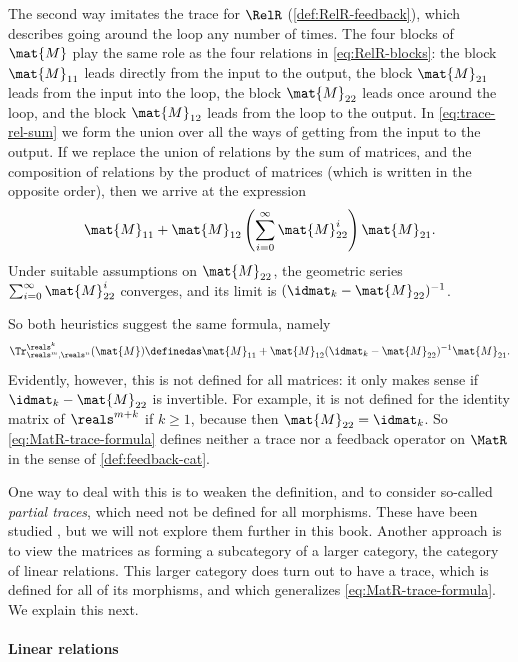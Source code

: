 The second way imitates the trace for $\RelR$ (\cref{def:RelR-feedback}), which describes going around the loop any number of times.
The four blocks of $\mat{M}$ play the same role as the four relations in \cref{eq:RelR-blocks}: the block $\mat{M}_{11}$ leads directly from the input to the output, the block $\mat{M}_{21}$ leads from the input into the loop, the block $\mat{M}_{22}$ leads once around the loop, and the block $\mat{M}_{12}$ leads from the loop to the output.
In \cref{eq:trace-rel-sum} we form the union over all the ways of getting from the input to the output.
If we replace the union of relations by the sum of matrices, and the composition of relations by the product of matrices (which is written in the opposite order), then we arrive at the expression
\begin{equation}
    \label{eq:MatR-trace-series}
    \mat{M}_{11} + \mat{M}_{12} \left( \sum_{i=0}^\infty \mat{M}_{22}^i \right) \mat{M}_{21}.
\end{equation}
Under suitable assumptions on $\mat{M}_{22}$, the geometric series $\sum_{i=0}^\infty \mat{M}_{22}^i$ converges, and its limit is $(\idmat_k - \mat{M}_{22})^{-1}$.

So both heuristics suggest the same formula, namely
\begin{equation}
    \label{eq:MatR-trace-formula}
    \Tr_{\reals^m,\reals^n}^{\reals^k} (\mat{M}) \definedas \mat{M}_{11} + \mat{M}_{12} (\idmat_k - \mat{M}_{22})^{-1} \mat{M}_{21}.
\end{equation}
Evidently, however, this is not defined for all matrices: it only makes sense if $\idmat_k - \mat{M}_{22}$ is invertible.
For example, it is not defined for the identity matrix of $\reals^{m+k}$ if $k \geq 1$, because then $\mat{M}_{22} = \idmat_k$.
So \cref{eq:MatR-trace-formula} defines neither a trace nor a feedback operator on $\MatR$ in the sense of \cref{def:feedback-cat}.

One way to deal with this is to weaken the definition, and to consider so-called \emph{partial traces}, which need not be defined for all morphisms.
These have been studied \cite{malherbe2012partially}, but we will not explore them further in this book.
Another approach is to view the matrices as forming a subcategory of a larger category, the category of linear relations.
This larger category does turn out to have a trace, which is defined for all of its morphisms, and which generalizes \cref{eq:MatR-trace-formula}.
We explain this next.


\paragraph{Linear relations}
\label{sec:trace-LinRel}

